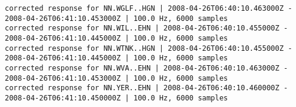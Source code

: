 \documentclass[11pt]{article}
\begin{document}
    \begin{Verbatim}[commandchars=\\\{\}]
corrected response for NN.WGLF..HGN | 2008-04-26T06:40:10.463000Z - 2008-04-26T06:41:10.453000Z | 100.0 Hz, 6000 samples
corrected response for NN.WIL..EHN | 2008-04-26T06:40:10.455000Z - 2008-04-26T06:41:10.445000Z | 100.0 Hz, 6000 samples
corrected response for NN.WTNK..HGN | 2008-04-26T06:40:10.455000Z - 2008-04-26T06:41:10.445000Z | 100.0 Hz, 6000 samples
corrected response for NN.WVA..EHN | 2008-04-26T06:40:10.463000Z - 2008-04-26T06:41:10.453000Z | 100.0 Hz, 6000 samples
corrected response for NN.YER..EHN | 2008-04-26T06:40:10.460000Z - 2008-04-26T06:41:10.450000Z | 100.0 Hz, 6000 samples

    \end{Verbatim}

    \begin{center}
    \end{center}
    { \hspace*{\fill} \\}
    
    \begin{center}
    \end{center}
    { \hspace*{\fill} \\}
    
    \begin{center}
    \end{center}
    { \hspace*{\fill} \\}
    
    \begin{center}
    \end{center}
    { \hspace*{\fill} \\}
    
    \begin{center}
    \end{center}
    { \hspace*{\fill} \\}
    
    \begin{center}
    \end{center}
    { \hspace*{\fill} \\}
    
\end{document}
